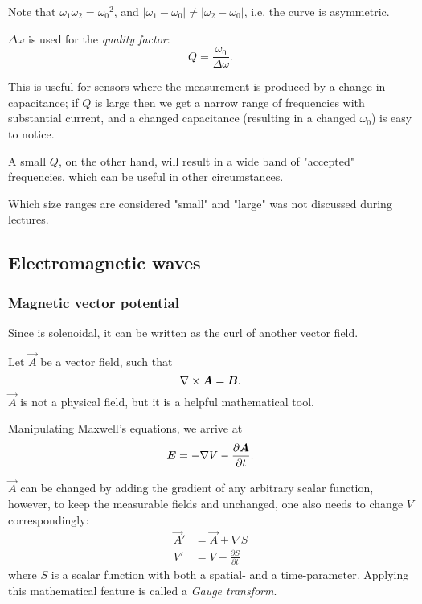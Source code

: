         Note that $\omega_1\omega_2={\omega_0}^2$, and $|\omega_1 - \omega_0| \neq |\omega_2 - \omega_0|$, i.e. the curve is asymmetric.

        $\Delta\omega$ is used for the \textit{quality factor}:
        \begin{equation}
            Q = \frac{\omega_0}{\Delta\omega}.
        \end{equation}

        This is useful for sensors where the measurement is produced by a change in capacitance; 
        if $Q$ is large then we get a narrow range of frequencies with substantial current, and a changed capacitance 
        (resulting in a changed $\omega_0$) is easy to notice. 

        A small $Q$, on the other hand, will result in a wide band of "accepted" frequencies, which can be useful in other circumstances.
    
        Which size ranges are considered "small" and "large" was not discussed during lectures. 

\subsection{Electromagnetic waves}
    \subsubsection{Magnetic vector potential}
        Since \B{} is solenoidal, it can be written as the curl of another vector field. 
        
        Let $\vec{A}$ be a vector field, such that
        \begin{equation}
            \nabla \times \bm{A} = \bm{B}.
        \end{equation}
        $\vec{A}$ is not a physical field, but it is a helpful mathematical tool. 

        Manipulating Maxwell's equations, we arrive at 
        \begin{equation}
            \bm{E} = -\nabla V - \frac{\partial \bm{A}}{\partial t}.
        \end{equation}
        
        $\vec{A}$ can be changed by adding the gradient of any arbitrary scalar function, 
        however, to keep the measurable fields \B{} and \E{} unchanged, one also needs to change $V$ correspondingly:
        \begin{align*}
            \vec{A}' &= \vec{A} + \nabla S \\
            V' &= V - \frac{\partial S}{\partial t}
        \end{align*}
        where $S$ is a scalar function with both a spatial- and a time-parameter.
        Applying this mathematical feature is called a \textit{Gauge transform}.

